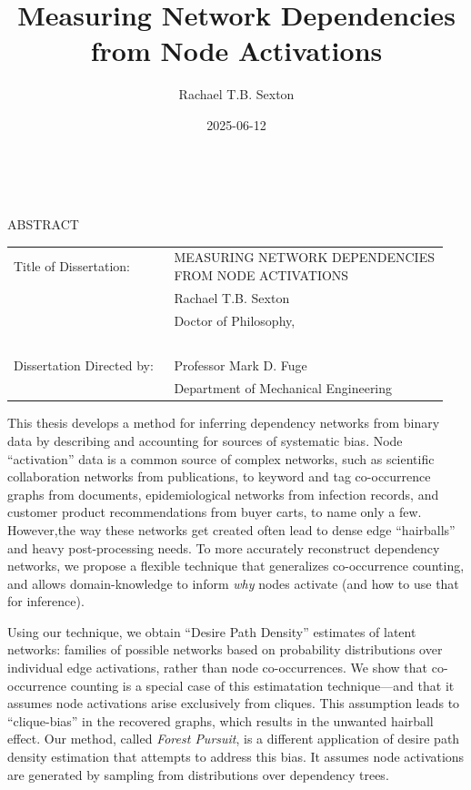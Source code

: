 \documentclass[%
	12pt,
		oneside,
		letterpaper
]{book}
\title{Measuring Network Dependencies from Node Activations}
\author{Rachael T.B. Sexton}
\date{2025-06-12}
\begin{document}
\pagestyle{empty}
\singlespacing

\hbox{\ }

\begin{center}
\large{{ABSTRACT}}

\vspace{3em}

\end{center}
\hspace{-.15in}
\begin{tabular}{p{0.35\linewidth}p{0.6\linewidth}}
Title of Dissertation:     & {\large \uppercase{Measuring Network Dependencies from Node Activations}}\\
                           & {\large  Rachael T.B. Sexton } \\
                           & {\large Doctor of Philosophy, } \\
\                         \\
Dissertation Directed by:  & {\large Professor Mark D. Fuge } \\
                           & {\large Department of Mechanical Engineering} \\
\end{tabular}

\vspace{3em}


\doublespacing
\large \normalsize
This thesis develops a method for inferring dependency networks from binary data by describing and accounting for sources of systematic bias.
Node ``activation'' data is a common source of complex networks, such as scientific collaboration networks from publications, to keyword and tag co-occurrence graphs from documents, epidemiological networks from infection records, and customer product recommendations from buyer carts, to name only a few.
However,the way these networks get created often lead to dense edge ``hairballs'' and heavy post-processing needs.
To more accurately reconstruct dependency networks, we propose a flexible technique that generalizes co-occurrence counting, and allows domain-knowledge to inform \emph{why} nodes activate (and how to use that for inference).

Using our technique, we obtain ``Desire Path Density'' estimates of latent networks: families of possible networks based on probability distributions over individual edge activations, rather than node co-occurrences.
We show that co-occurrence counting is a special case of this estimatation technique---and that it assumes node activations arise exclusively from cliques.
This assumption leads to ``clique-bias'' in the recovered graphs, which results in the unwanted hairball effect.
Our method, called \emph{Forest Pursuit}, is a different application of desire path density estimation that attempts to address this bias.
It assumes node activations are generated by sampling from distributions over dependency trees.
\end{document}
